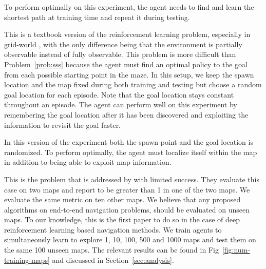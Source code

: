 \begin{description}
  \label{prob:sss}
  To perform optimally on this experiment, the agent needs to find and learn the shortest path at training time and repeat it during testing. 

  This is a textbook version of the reinforcement learning problem, especially in grid-world \cite{SuBaBOOK1998}, with the only difference being that the environment is partially observable instead of fully observable.
  This problem is more difficult than Problem~\ref{prob:sss} because the agent
  must find an optimal policy to the goal from each possible starting point in the maze.
  In this setup, we keep the spawn location and the map fixed during both training and testing but choose a random goal location for each episode.
  Note that the goal location stays constant throughout an episode.
  The agent can perform well on this experiment by remembering the goal location after it has been discovered and exploiting the information to revisit the goal faster.  
  
  In this version of the experiment both the spawn point and the goal location is randomized. To perform optimally, the agent must localize itself within the map in addition to being able to exploit map-information.
  
  This is the problem that is addressed by \cite{MiPaViICLR2017} with limited success. 
  They evaluate this case on two maps and report \LatencyOneGtOne{} to be greater than 1 in one of the two maps. We evaluate the same metric on ten other maps.
    We believe that any proposed algorithms on end-to-end navigation problems, should be evaluated on unseen maps.
    To our knowledge, this is the first paper to do so in the case of deep reinforcement learning based navigation methods.
    We train agents to simultaneously learn to explore 1, 10, 100, 500 and 1000 maps and test them on the same 100 unseen maps. The relevant results can be found in Fig~\ref{fig:num-training-maps} and discussed in Section~\ref{sec:analysis}. 
\end{description}

